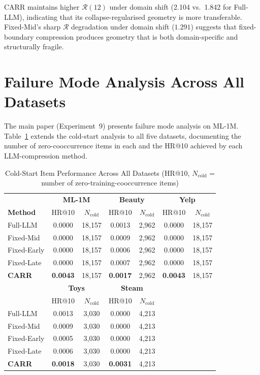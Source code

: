 \documentclass[letterpaper,10pt]{article}
\begin{document}
CARR maintains higher $\mathcal{R}(12)$ under domain shift (2.104 vs.\ 1.842 for Full-LLM), indicating that its collapse-regularised geometry is more transferable. Fixed-Mid's sharp $\mathcal{R}$ degradation under domain shift ($1.291$) suggests that fixed-boundary compression produces geometry that is both domain-specific and structurally fragile.

\section{Failure Mode Analysis Across All Datasets}
\label{sec:supp-failure-modes}

The main paper (Experiment~9) presents failure mode analysis on ML-1M. Table~\ref{tab:supp-coldstart-all} extends the cold-start analysis to all five datasets, documenting the number of zero-cooccurrence items in each and the HR@10 achieved by each LLM-compression method.

\begin{table}[h!]
\centering
\caption{Cold-Start Item Performance Across All Datasets (HR@10, $N_{\text{cold}}$ = number of zero-training-cooccurrence items)\label{tab:supp-coldstart-all}}
\begin{tabular}{l|cc|cc|cc}
\toprule
& \multicolumn{2}{c|}{\textbf{ML-1M}} & \multicolumn{2}{c|}{\textbf{Beauty}} & \multicolumn{2}{c}{\textbf{Yelp}} \\
\textbf{Method} & HR@10 & $N_{\text{cold}}$ & HR@10 & $N_{\text{cold}}$ & HR@10 & $N_{\text{cold}}$ \\
\midrule
Full-LLM     & 0.0000 & 18,157 & 0.0013 & 2,962 & 0.0000 & 18,157 \\
Fixed-Mid    & 0.0000 & 18,157 & 0.0009 & 2,962 & 0.0000 & 18,157 \\
Fixed-Early  & 0.0000 & 18,157 & 0.0006 & 2,962 & 0.0000 & 18,157 \\
Fixed-Late   & 0.0000 & 18,157 & 0.0007 & 2,962 & 0.0000 & 18,157 \\
\textbf{CARR}& \textbf{0.0043} & 18,157 & \textbf{0.0017} & 2,962 & \textbf{0.0043} & 18,157 \\
\midrule
& \multicolumn{2}{c|}{\textbf{Toys}} & \multicolumn{2}{c|}{\textbf{Steam}} & & \\
& HR@10 & $N_{\text{cold}}$ & HR@10 & $N_{\text{cold}}$ & & \\
\midrule
Full-LLM     & 0.0013 & 3,030 & 0.0000 & 4,213 & & \\
Fixed-Mid    & 0.0009 & 3,030 & 0.0000 & 4,213 & & \\
Fixed-Early  & 0.0005 & 3,030 & 0.0000 & 4,213 & & \\
Fixed-Late   & 0.0006 & 3,030 & 0.0000 & 4,213 & & \\
\textbf{CARR}& \textbf{0.0018} & 3,030 & \textbf{0.0031} & 4,213 & & \\
\bottomrule
\end{tabular}
\end{table}
\end{document}
